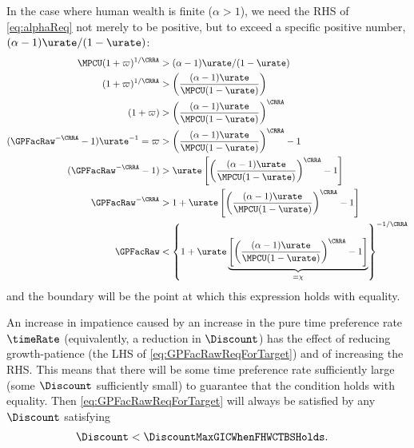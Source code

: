 \documentclass{\handout}
\begin{document}
In the case where human wealth is finite ($\alpha > 1$), we need the RHS of \eqref{eq:alphaReq} not merely to be positive, but to exceed a specific positive number, $(\alpha-1)\urate/(1-\urate)$:  
\begin{equation}\begin{gathered}\begin{aligned}
    \MPCU (1+\varpi)^{1/\CRRA} & >  (\alpha-1)\urate/(1-\urate)
\\   (1+\varpi)^{1/\CRRA} & >  \left(\frac{(\alpha-1)\urate}{\MPCU (1-\urate)}\right)
\\   (1+\varpi) & >  \left(\frac{(\alpha-1)\urate}{\MPCU (1-\urate)}\right)^{\CRRA}
\\  (\GPFacRaw^{-\CRRA}-1)\urate^{-1} = \varpi & >  \left(\frac{(\alpha-1)\urate}{\MPCU (1-\urate)}\right)^{\CRRA}-1
\\  (\GPFacRaw^{-\CRRA}-1) & >  \urate \left[\left(\frac{(\alpha-1)\urate}{\MPCU (1-\urate)}\right)^{\CRRA}-1\right]
\\  \GPFacRaw^{-\CRRA} & >  1  + \urate \left[\left(\frac{(\alpha-1)\urate}{\MPCU (1-\urate)}\right)^{\CRRA}-1\right]
\\  \GPFacRaw & <  \left\{1  + \urate \underbrace{\left[\left(\frac{(\alpha-1)\urate}{\MPCU (1-\urate)}\right)^{\CRRA}-1\right]}_{\equiv \chi} \right\}^{-1/\CRRA} \label{eq:GPFacRawReqForTarget}
\end{aligned}\end{gathered}\end{equation}
and the boundary will be the point at which this expression holds with equality.  

An increase in impatience caused by an increase in the pure time preference rate $\timeRate$ (equivalently, a reduction in $\Discount$) has the effect of reducing growth-patience (the LHS of \eqref{eq:GPFacRawReqForTarget}) and of increasing the RHS.  This means that there will be some time preference rate sufficiently large (some $\Discount$ sufficiently small) to guarantee that the condition holds with equality.  Then \eqref{eq:GPFacRawReqForTarget} will always be satisfied by any $\Discount$ satisfying 
\begin{equation}\begin{gathered}\begin{aligned}
  \Discount & <  \DiscountMaxGICWhenFHWCTBSHolds \label{eq:DiscountMaxGICWhenFHWCTBSHolds}
.\end{aligned}\end{gathered}\end{equation}
\end{document}
